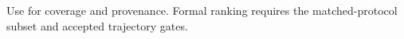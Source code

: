 Use for coverage and provenance. Formal ranking requires the matched-protocol subset and accepted trajectory gates.
